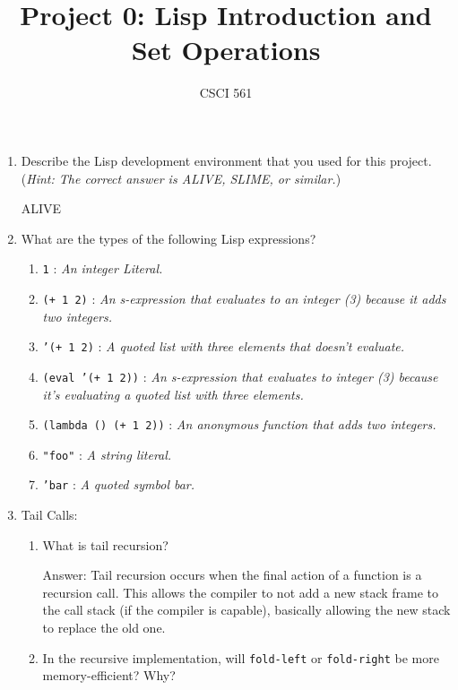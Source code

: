 \documentclass[12pt,letterpaper]{ntdhw}
\title{Project 0: Lisp Introduction and Set Operations}
\author{CSCI 561}
\begin{document}
\pagestyle{fancyplain}

\maketitle
\thispagestyle{fancyplain}

\begin{enumerate}

  \item Describe the Lisp development environment that you used for
  this project.  (\emph{Hint: The correct answer is ALIVE, SLIME, or
    similar.})

    ALIVE

  \item What are the types of the following Lisp expressions?
  \begin{enumerate}
    \item {\tt 1} : \emph{
      An integer Literal.
    }
    \item {\tt (+ 1 2)} : \emph{
      An s-expression that evaluates to an integer (3) because it adds two integers.
    }
    \item {\tt '(+ 1 2)} : \emph{
      A quoted list with three elements that doesn't evaluate.
    }
    \item {\tt (eval '(+ 1 2))} : \emph{
      An s-expression that evaluates to integer (3) because it's evaluating a quoted list with three elements.
    }
    \item {\tt (lambda () (+ 1 2))} : \emph{
      An anonymous function that adds two integers.
    }
    \item {\tt "foo"} : \emph{
      A string literal.
    }
    \item {\tt 'bar} : \emph{
      A quoted symbol bar.
    }
  \end{enumerate}

  \item Tail Calls:
  \begin{enumerate}
    \item What is tail recursion?

    \begin{emph}
      Answer: Tail recursion occurs when the final action of a function is a recursion call. This allows the compiler to not add a new stack frame to the call stack (if the compiler is capable), basically allowing the new stack to replace the old one.
    \end{emph}

    \item In the recursive implementation, will {\tt fold-left} or
    {\tt fold-right} be more memory-efficient?  Why?


\end{enumerate}
\end{enumerate}
\end{document}
